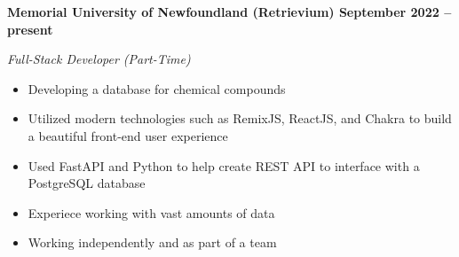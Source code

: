\vspace{0.1cm}
\textbf{Memorial University of Newfoundland (Retrievium) \hfill September 2022 -- present} \par
\textit{Full-Stack Developer (Part-Time)} \par
\begin{itemize}
    \item Developing a database for chemical compounds
    \item Utilized modern technologies such as RemixJS, ReactJS, and Chakra to build a beautiful front-end user experience
    \item Used FastAPI and Python to help create REST API to interface with a PostgreSQL database
	\item Experiece working with vast amounts of data
    \item Working independently and as part of a team
\end{itemize} \par